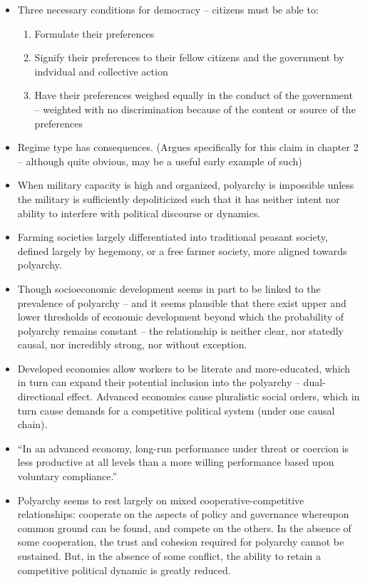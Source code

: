 \documentclass[12pt]{article}
\begin{document}
\begin{itemize}[leftmargin=*, itemsep=4pt]
    \item Three necessary conditions for democracy -- citizens must be able to:
    \begin{enumerate}
        \item Formulate their preferences
        \item Signify their preferences to their fellow citizens and the government by indvidual and collective action
        \item Have their preferences weighed equally in the conduct of the government -- weighted with no discrimination because of the content or source of the preferences
    \end{enumerate}
    \item Regime type has consequences. (Argues specifically for this claim in chapter 2 -- although quite obvious, may be a useful early example of such)
    \item When military capacity is high and organized, polyarchy is impossible unless the military is sufficiently depoliticized such that it has neither intent nor ability to interfere with political discourse or dynamics.
    \item Farming societies largely differentiated into traditional peasant society, defined largely by hegemony, or a free farmer society, more aligned towards polyarchy.
    \item Though socioeconomic development seems in part to be linked to the prevalence of polyarchy -- and it seems plausible that there exist upper and lower thresholds of economic development beyond which the probability of polyarchy remains constant -- the relationship is neither clear, nor statedly causal, nor incredibly strong, nor without exception.
    \item Developed economies allow workers to be literate and more-educated, which in turn can expand their potential inclusion into the polyarchy -- dual-directional effect. Advanced economies cause pluralistic social orders, which in turn cause demands for a competitive political system (under one causal chain).
    \item ``In an advanced economy, long-run performance under threat or coercion is less productive at all levels than a more willing performance based upon voluntary compliance.''
    \item Polyarchy seems to rest largely on mixed cooperative-competitive relationships: cooperate on the aspects of policy and governance whereupon common ground can be found, and compete on the others. In the absence of some cooperation, the trust and cohesion required for polyarchy cannot be sustained. But, in the absence of some conflict, the ability to retain a competitive political dynamic is greatly reduced.

\end{itemize}
\end{document}
